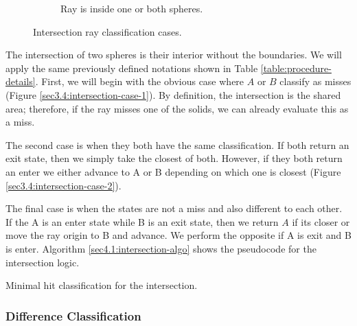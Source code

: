 \documentclass[a4paper,11pt,oneside]{article}
\begin{document}
\begin{figure}[ht]
\begin{subfigure}[b]{0.3\textwidth}
		\caption{Ray is inside one or both spheres.}
		\label{sec3.4:intersection-case-3}
	\end{subfigure}
	\caption{Intersection ray classification cases.}
	\label{sec3.4:sphere-intersection}
\end{figure}

The intersection of two spheres is their interior without the boundaries. We will apply the same previously defined notations shown in Table \ref{table:procedure-details}. First, we will begin with the obvious case where $A$ or $B$ classify as misses (Figure \ref{sec3.4:intersection-case-1}). By definition, the intersection is the shared area; therefore, if the ray misses one of the solids, we can already evaluate this as a miss.

The second case is when they both have the same classification. If both return an exit state, then we simply take the closest of both. However, if they both return an enter we either advance to A or B depending on which one is closest (Figure \ref{sec3.4:intersection-case-2}).

The final case is when the states are not a miss and also different to each other. If the A is an enter state while B is an exit state, then we return $A$ if its closer or move the ray origin to B and advance. We perform the opposite if A is exit and B is enter. Algorithm \ref{sec4.1:intersection-algo} shows the pseudocode for the intersection logic.

\begin{algorithm}
	\SetAlgoLined
	\caption{Minimal hit classification for the intersection.}
	\label{sec4.1:intersection_algo}
\end{algorithm}

\subsubsection{Difference Classification}
\label{section:minimal_difference_classficiation}
\end{document}
